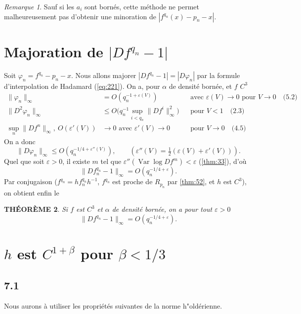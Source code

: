 \documentclass[12pt]{amsart}
\theoremstyle{plain}
\newtheorem{theoreme}{TH\'{E}OR\`{E}ME}[section]
\theoremstyle{remark}
\newtheorem{remarque}[theoreme]{Remarque}
\DeclareMathOperator*{\Var}{Var}
\begin{document}
\begin{remarque}\label{rem:54}
Sauf si les $a_{i}$ sont born\'{e}s, cette m\'{e}thode ne permet malheureusement pas d'obtenir une minoration de $|f^{q_{n}}(x) - p_{n} - x|$.
\end{remarque}

\section{Majoration de $|Df^{q_{n}} - 1|$}

Soit $\varphi_{n} = f^{q_{n}} - p_{n} - x$. Nous allons majorer $|Df^{q_{n}} - 1| = |D\varphi_{n}|$ par la formule d'interpolation de Hadamard (\ref{eq:221}). On a, pour $\alpha$ de densit\'{e} born\'{e}e, et $f$ $C^{3}$
\begin{align*}
\|\varphi_{n}\|_{\infty} &= O(q_{n}^{-1+\varepsilon(V)}) && \text{avec } \varepsilon(V) \to 0 \text{ pour } V \to 0 \quad \text{(5.2)} \\
\|D^{2}\varphi_{n}\|_{\infty} &\leq O\bigl(q_{n}^{-1} \sup_{i < q_{n}} \|Df^{i}\|_{\infty}^{2}\bigr) && \text{pour } V < 1 \quad \text{(2.3)} \\
\sup_{n} \|Df^{n}\|_{\infty}, \ O(\varepsilon'(V)) &\to 0 \text{ avec } \varepsilon'(V) \to 0 && \text{pour } V \to 0 \quad \text{(4.5)}
\end{align*}
On a donc
\[
\|D\varphi_{n}\|_{\infty} \leq O(q_{n}^{-1/4+\varepsilon''(V)}) , \qquad (\varepsilon''(V) = \tfrac{1}{2}(\varepsilon(V) + \varepsilon'(V))) .
\]
Quel que soit $\varepsilon > 0$, il existe $m$ tel que $\varepsilon''(\Var\log Df^{m}) < \varepsilon$ (\ref{thm:33}), d'o\`{u}
\[
\|Df_{n}^{q_{n}} - 1\|_{\infty} = O(q_{n}^{-1/4+\varepsilon}) .
\]
Par conjugaison ($f^{q_{n}} = hf_{n}^{q_{n}}h^{-1}$, $f^{q_{n}}$ est proche de $R_{p_{n}}$ par \ref{thm:52}, et $h$ est $C^{3}$), on obtient enfin le

\begin{theoreme}\label{thm:61}
Si $f$ est $C^{3}$ et $\alpha$ de densit\'{e} born\'{e}e, on a pour tout $\varepsilon > 0$
\[
\|Df^{q_{n}} - 1\|_{\infty} = O(q_{n}^{-1/4+\varepsilon}) .
\]
\end{theoreme}

\section{$h$ est $C^{1+\beta}$ pour $\beta < 1/3$}

\subsection*{7.1}
Nous aurons \`{a} utiliser les propri\'{e}t\'{e}s suivantes de la norme h"{o}ld\'{e}rienne.
\end{document}
